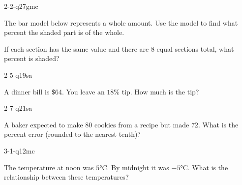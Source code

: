 \begin{practiceQuestion}{2-2-q27}{gmc}
\begin{questionText}
The bar model below represents a whole amount. Use the model to find what percent the shaded part is of the whole.

\begin{center}
\end{center}

If each section has the same value and there are $8$ equal sections total, what percent is shaded?
\end{questionText}
\end{practiceQuestion}

\begin{practiceQuestion}{2-5-q19}{sa}
\begin{questionText}
A dinner bill is $\$64$. You leave an $18\%$ tip. How much is the tip?
\end{questionText}
\end{practiceQuestion}

\begin{practiceQuestion}{2-7-q21}{sa}
\begin{questionText}
A baker expected to make $80$ cookies from a recipe but made $72$. What is the percent error (rounded to the nearest tenth)?
\end{questionText}
\end{practiceQuestion}

\begin{practiceQuestion}{3-1-q12}{mc}
\begin{questionText}
The temperature at noon was $5°$C. By midnight it was $-5°$C. What is the relationship between these temperatures?
\end{questionText}
\end{practiceQuestion}

